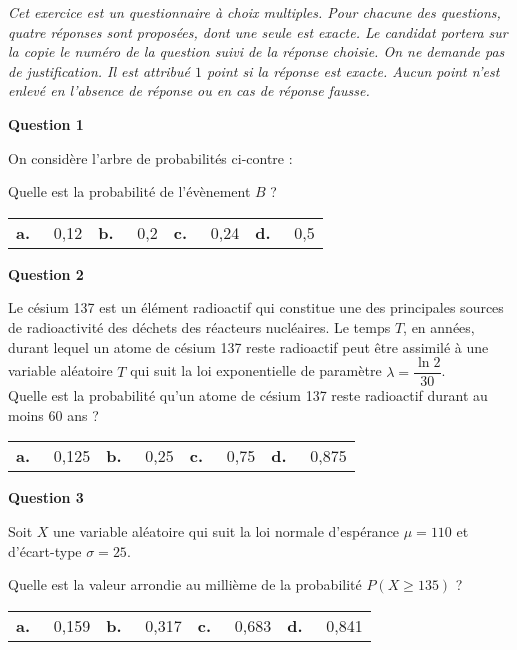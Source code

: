 \documentclass[12pt,french]{article}
\begin{document}
\begin{question}[subtitle={Métropole septembre 2015}]
\emph{Cet exercice est un questionnaire à choix multiples. Pour chacune des questions, quatre réponses sont proposées, dont une seule est exacte. Le candidat portera sur la copie le numéro de la question suivi de la réponse choisie. On ne demande pas de justification. Il est attribué $1$ point si la réponse est exacte. Aucun point n'est enlevé en l'absence de réponse ou en cas de réponse fausse.}

\medskip

\textbf{Question 1}

\parbox{0.6\linewidth}{On considère l'arbre de probabilités ci-contre :}\hfill
\medskip

Quelle est la probabilité de l'évènement $B$ ?

\medskip
\begin{tabularx}{\linewidth}{*{4}{X}}
\textbf{a.~~} 0,12&\textbf{b.~~} 0,2&\textbf{c.~~} 0,24 &\textbf{d.~~} 0,5
\end{tabularx}
\medskip

\textbf{Question 2}

Le césium 137 est un élément radioactif qui constitue une des principales sources de radioactivité des déchets des réacteurs nucléaires. Le temps $T$, en années, durant lequel un atome de césium 137 reste radioactif peut être assimilé à une variable aléatoire $T$ qui suit la loi exponentielle de paramètre $\lambda = \dfrac{\ln 2}{30}$.\\[5pt]
Quelle est la probabilité qu'un atome de césium 137 reste radioactif durant au moins 60 ans ?

\medskip
\begin{tabularx}{\linewidth}{*{4}{X}}
\textbf{a.~~} 0,125&\textbf{b.~~} 0,25&\textbf{c.~~} 0,75 &\textbf{d.~~} 0,875
\end{tabularx}
\medskip

\textbf{Question 3}

Soit $X$ une variable aléatoire qui suit la loi normale d'espérance $\mu = 110$ et d'écart-type $\sigma = 25$.

Quelle est la valeur arrondie au millième de la probabilité $P( X \geqslant 135)$ ?

\medskip
\begin{tabularx}{\linewidth}{*{4}{X}}
\textbf{a.~~} 0,159&\textbf{b.~~} 0,317 &\textbf{c.~~} 0,683 &\textbf{d.~~} 0,841
\end{tabularx}
\medskip
\end{question}
\end{document}
